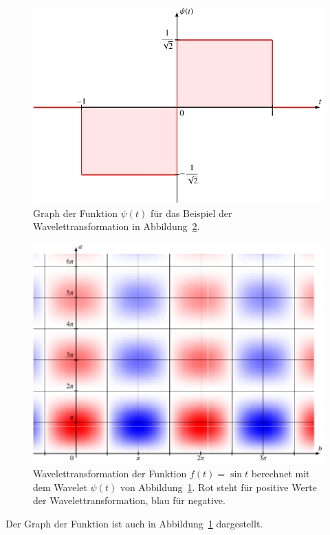 \begin{beispiel}
\begin{figure}
\centering
\includegraphics{chapters/4-cwt/images/psigraph.pdf}
\caption{Graph der Funktion $\psi(t)$ für das Beispiel der
Wavelettransformation in Abbildung~\ref{cwt:psi-cwt}.
\label{cwt:psi-graph}}
\end{figure}
\begin{figure}
\centering
\includegraphics[width=\hsize]{chapters/4-cwt/images/psisin.pdf}
\caption{Wavelettransformation der Funktion $f(t)=\sin t$ berechnet
mit dem Wavelet $\psi(t)$ von Abbildung~\ref{cwt:psi-graph}.
Rot steht für positive Werte der Wavelettransformation, blau für negative.
\label{cwt:psi-cwt}}
\end{figure}
Der Graph der Funktion ist auch in Abbildung~\ref{cwt:psi-graph} dargestellt.

\end{beispiel}
